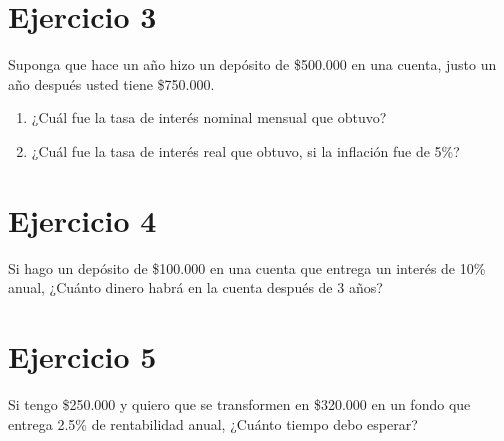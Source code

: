 \documentclass[11pt,letterpaper]{article}
\begin{document}
\section*{Ejercicio 3}
Suponga que hace un año hizo un depósito de \$500.000 en una cuenta, justo un año después usted tiene
\$750.000.
\begin{enumerate}
    \item ¿Cuál fue la tasa de interés nominal mensual que obtuvo?
    \item ¿Cuál fue la tasa de interés real que obtuvo, si la inflación fue de 5\%?
\end{enumerate}

\section*{Ejercicio 4}
Si hago un depósito de \$100.000 en una cuenta que entrega un interés de 10\% anual, ¿Cuánto dinero habrá en la cuenta después de 3 años?

\section*{Ejercicio 5}
Si tengo \$250.000 y quiero que se transformen en \$320.000 en un fondo que entrega 2.5\% de rentabilidad anual, ¿Cuánto tiempo debo esperar?
\end{document}
